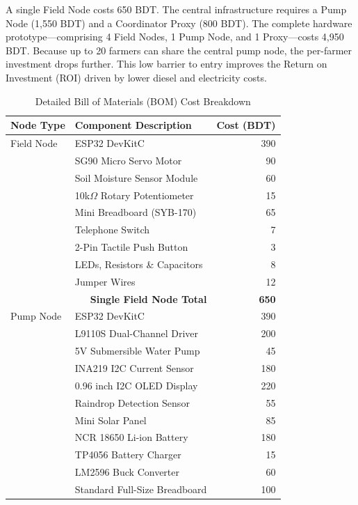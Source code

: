 \documentclass[conference]{IEEEtran}
\begin{document}
A single Field Node costs 650 BDT. The central infrastructure requires a Pump Node (1,550 BDT) and a Coordinator Proxy (800 BDT). The complete hardware prototype---comprising 4 Field Nodes, 1 Pump Node, and 1 Proxy---costs 4,950 BDT. Because up to 20 farmers can share the central pump node, the per-farmer investment drops further. This low barrier to entry improves the Return on Investment (ROI) driven by lower diesel and electricity costs.

\begin{table}[htbp]
\caption{Detailed Bill of Materials (BOM) Cost Breakdown}
\begin{center}
\begin{tabular}{|l|l|r|}
\hline
\textbf{Node Type} & \textbf{Component Description} & \textbf{Cost (BDT)} \\
\hline
Field Node & ESP32 DevKitC & 390 \\
           & SG90 Micro Servo Motor & 90 \\
           & Soil Moisture Sensor Module & 60 \\
           & 10k$\Omega$ Rotary Potentiometer & 15 \\
           & Mini Breadboard (SYB-170) & 65 \\
           & Telephone Switch & 7 \\
           & 2-Pin Tactile Push Button & 3 \\
           & LEDs, Resistors \& Capacitors & 8 \\
           & Jumper Wires & 12 \\
\hline
\multicolumn{2}{|r|}{\textbf{Single Field Node Total}} & \textbf{650} \\
\hline
Pump Node  & ESP32 DevKitC & 390 \\
           & L9110S Dual-Channel Driver & 200 \\
           & 5V Submersible Water Pump & 45 \\
           & INA219 I2C Current Sensor & 180 \\
           & 0.96 inch I2C OLED Display & 220 \\
           & Raindrop Detection Sensor & 55 \\
           & Mini Solar Panel & 85 \\
           & NCR 18650 Li-ion Battery & 180 \\
           & TP4056 Battery Charger & 15 \\
           & LM2596 Buck Converter & 60 \\
           & Standard Full-Size Breadboard & 100 \\

\end{tabular}
\end{center}
\end{table}
\end{document}
